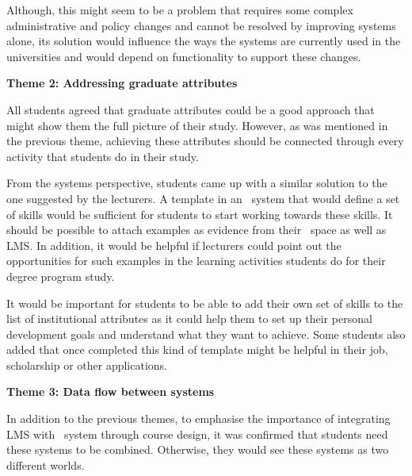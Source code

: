 Although, this might seem to be a problem that requires some complex
administrative and policy changes and cannot be resolved by improving systems
alone, its solution would influence the ways the systems are currently used in
the universities and would depend on functionality to support these changes.

\textbf{Theme 2: Addressing graduate attributes}

All students agreed that graduate attributes could be a good approach that might
show them the full picture of their study. However, as was mentioned in the
previous theme, achieving these attributes should be connected through every
activity that students do in their study.


From the systems perspective, students came up with a similar solution to the
one suggested by the lecturers. A template in an \ep~system that would define a
set of \LLLs skills would be sufficient for students to start working towards
these skills. It should be possible to attach examples as evidence from their
\ep~space as well as LMS. In addition, it would be helpful if lecturers could
point out the opportunities for such examples in the learning activities
students do for their degree program study.

It would be important for students to be able to add their own set of skills to
the list of institutional attributes as it could help them to set up their
personal development goals and understand what they want to achieve. Some
students also added that once completed this kind of template might be helpful
in their job, scholarship or other applications.

\textbf{Theme 3: Data flow between systems}

In addition to the previous themes, to emphasise the importance of integrating
LMS with \ep~system through course design, it was confirmed that students need
these systems to be combined. Otherwise, they would see these systems as two
different worlds.


